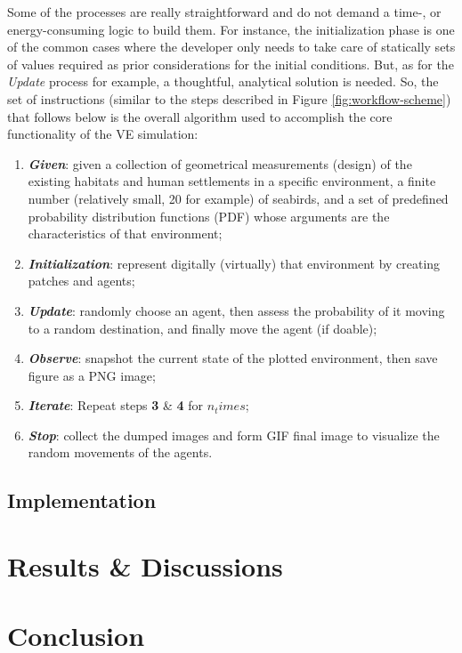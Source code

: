 Some of the processes are really straightforward and do not demand a time-, or energy-consuming logic to build them. For instance, the initialization phase is one of the common cases where the developer only needs to take care of statically sets of values required as prior considerations for the initial conditions. But, as for the \emph{Update} process for example, a thoughtful, analytical solution is needed. So, the set of instructions (similar to the steps described in Figure \ref{fig:workflow-scheme}) that follows below is the overall algorithm used to accomplish the core functionality of the VE simulation:
\begin{enumerate}
    \item \textbf{\textit{Given}}: given a collection of geometrical measurements (design) of the existing habitats and human settlements in a specific environment, a finite number (relatively small, 20 for example) of seabirds, and a set of predefined probability distribution functions (PDF) whose arguments are the characteristics of that environment;
    \item \textbf{\textit{Initialization}}: represent digitally (virtually) that environment by creating patches and agents;
    \item \textbf{\textit{Update}}: randomly choose an agent, then assess the probability of it moving to a random destination, and finally move the agent (if doable);
    \item \textbf{\textit{Observe}}: snapshot the current state of the plotted environment, then save figure as a PNG image;
    \item \textbf{\textit{Iterate}}: Repeat steps \textbf{3} \& \textbf{4} for $n_times$;
    \item \textbf{\textit{Stop}}: collect the dumped images and form GIF final image to visualize the random movements of the agents.
\end{enumerate}


\subsection{Implementation}

\section{Results \& Discussions}

\section{Conclusion}

